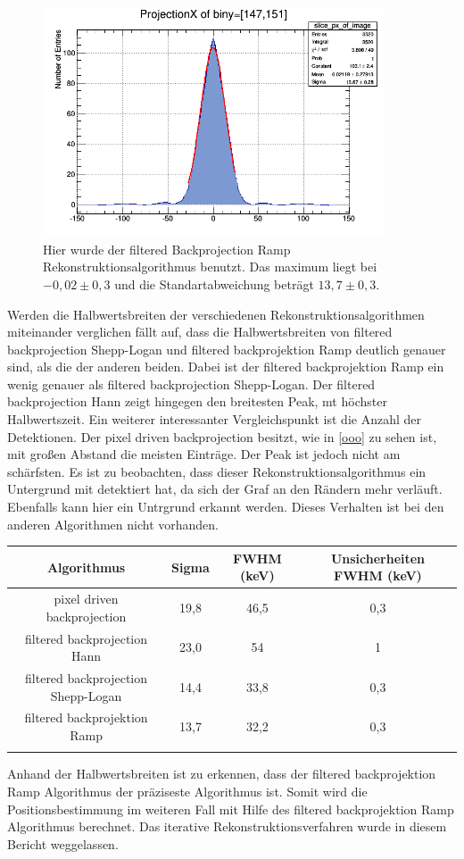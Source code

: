 \begin{figure}[h!]
	\centering
	\includegraphics[width=0.9\textwidth]{Ramp-Filter.png}
	\caption{Hier wurde der filtered Backprojection Ramp Rekonstruktionsalgorithmus benutzt. Das maximum liegt bei $-0,02 \pm 0,3$ und die Standartabweichung beträgt $13,7 \pm 0,3$.}
	\label{oor}
\end{figure}
Werden die Halbwertsbreiten der verschiedenen Rekonstruktionsalgorithmen miteinander verglichen fällt auf, dass die Halbwertsbreiten von filtered backprojection Shepp-Logan und filtered backprojektion Ramp deutlich genauer sind, als die der anderen beiden.
Dabei ist der filtered backprojektion Ramp ein wenig genauer als filtered backprojection Shepp-Logan. Der filtered backprojection Hann zeigt hingegen  den breitesten Peak, mt höchster Halbwertszeit.
Ein weiterer interessanter Vergleichspunkt ist die Anzahl der Detektionen. Der pixel driven backprojection besitzt, wie in \cref{ooo} zu sehen ist, mit großen Abstand die meisten Einträge. Der Peak ist jedoch nicht am schärfsten. Es ist zu beobachten, dass dieser Rekonstruktionsalgorithmus ein Untergrund mit detektiert hat, da sich der Graf an den Rändern mehr verläuft. Ebenfalls kann hier ein Untrgrund erkannt werden. Dieses Verhalten ist bei den anderen Algorithmen nicht vorhanden.
\begin{tabular}{|c|c|c|c|}
	\hline 
	Algorithmus & Sigma & FWHM (keV) & Unsicherheiten FWHM (keV) \\ 
	\hline 
	pixel driven backprojection & 19,8 & 46,5 & 0,3 \\ 
	\hline 
	filtered backprojection Hann & 23,0 & 54 & 1  \\ 
	\hline 
	filtered backprojection Shepp-Logan & 14,4 & 33,8 & 0,3 \\ 
	\hline 
	filtered backprojektion Ramp & 13,7 & 32,2 & 0,3 \\ 
	\hline 
	\label{oot}
\end{tabular} 
Anhand der Halbwertsbreiten ist zu erkennen, dass der filtered backprojektion Ramp Algorithmus der präziseste Algorithmus ist. Somit wird die Positionsbestimmung im weiteren Fall mit Hilfe des filtered backprojektion Ramp Algorithmus berechnet.
Das iterative Rekonstruktionsverfahren wurde in diesem Bericht weggelassen.

